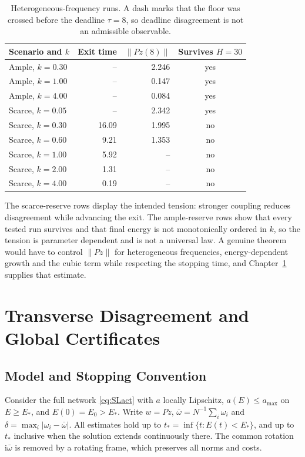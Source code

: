 \documentclass[11pt,notitlepage]{report}
\theoremstyle{definition}
\theoremstyle{remark}
\newcommand{\ii}{\mathrm i}
\begin{document}
\begin{table}[ht]\centering\small
\caption{Heterogeneous-frequency runs. A dash marks that the floor was crossed before the deadline $\tau=8$, so deadline disagreement is not an admissible observable.}
\begin{tabular}{lrrc}\toprule
Scenario and $k$&Exit time&$\|Pz(8)\|$&Survives $H=30$\\\midrule
Ample, $k=0.30$&--&2.246&yes\\
Ample, $k=1.00$&--&0.147&yes\\
Ample, $k=4.00$&--&0.084&yes\\
Scarce, $k=0.05$&--&2.342&yes\\
Scarce, $k=0.30$&16.09&1.995&no\\
Scarce, $k=0.60$&9.21&1.353&no\\
Scarce, $k=1.00$&5.92&--&no\\
Scarce, $k=2.00$&1.31&--&no\\
Scarce, $k=4.00$&0.19&--&no\\\bottomrule
\end{tabular}
\end{table}
The scarce-reserve rows display the intended tension: stronger coupling reduces disagreement while advancing the exit. The ample-reserve rows show that every tested run survives and that final energy is not monotonically ordered in $k$, so the tension is parameter dependent and is not a universal law. A genuine theorem would have to control $\|Pz\|$ for heterogeneous frequencies, energy-dependent growth and the cubic term while respecting the stopping time, and Chapter~\ref{ch:transverse} supplies that estimate.
\chapter{Transverse Disagreement and Global Certificates}\label{ch:transverse}

\section{Model and Stopping Convention}
Consider the full network \eqref{eq:SLact} with $a$ locally Lipschitz, $a(E)\le a_{\max}$ on $E\ge E_*$, and $E(0)=E_0>E_*$. Write $w=Pz$, $\bar\omega=N^{-1}\sum_i\omega_i$ and $\delta=\max_i|\omega_i-\bar\omega|$. All estimates hold up to $t_*=\inf\{t:E(t)<E_*\}$, and up to $t_*$ inclusive when the solution extends continuously there. The common rotation $\ii\bar\omega$ is removed by a rotating frame, which preserves all norms and costs.
\end{document}
